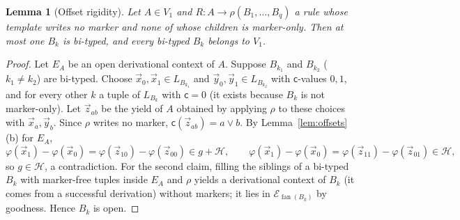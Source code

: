 \documentclass[11pt]{article}
\newtheorem{lemma}[theorem]{Lemma}
\theoremstyle{definition}
\theoremstyle{remark}
\newcommand{\tuple}[1]{\vec{#1}}
\newcommand{\mk}{\mathsf c}
\newcommand{\fan}{\operatorname{fan}}
\begin{document}
\begin{lemma}[Offset rigidity]\label{lem:rigidity}
Let $A\in V_1$ and $R:A\to\rho(B_1,\ldots,B_q)$ a rule whose template
writes no marker and none of whose children is marker-only.  Then at most
one $B_k$ is bi-typed, and every bi-typed $B_k$ belongs to $V_1$.
\end{lemma}
\begin{proof}
Let $E_A$ be an open derivational context of $A$.  Suppose $B_{k_1}$ and
$B_{k_2}$ ($k_1\ne k_2$) are bi-typed.  Choose $\tuple x_0,\tuple x_1\in
L_{B_{k_1}}$ and $\tuple y_0,\tuple y_1\in L_{B_{k_2}}$ with $\mk$-values
$0,1$, and for every other $k$ a tuple of $L_{B_k}$ with $\mk=0$ (it exists
because $B_k$ is not marker-only).  Let $\tuple z_{ab}$ be the yield of $A$
obtained by applying $\rho$ to these choices with $\tuple x_a,\tuple y_b$.
Since $\rho$ writes no marker, $\mk(\tuple z_{ab})=a\vee b$.  By
Lemma~\ref{lem:offsets}(b) for $E_A$,
\[
\varphi(\tuple x_1)-\varphi(\tuple x_0)
=\varphi(\tuple z_{10})-\varphi(\tuple z_{00})\in g+\mathcal H,
\qquad
\varphi(\tuple x_1)-\varphi(\tuple x_0)
=\varphi(\tuple z_{11})-\varphi(\tuple z_{01})\in\mathcal H,
\]
so $g\in\mathcal H$, a contradiction.  For the second claim, filling the
siblings of a bi-typed $B_k$ with marker-free tuples inside $E_A$ and $\rho$
yields a derivational context of $B_k$ (it comes from a successful
derivation) without markers; it lies in $\mathcal E_{\fan(B_k)}$ by
goodness.  Hence $B_k$ is open.
\end{proof}
\end{document}

